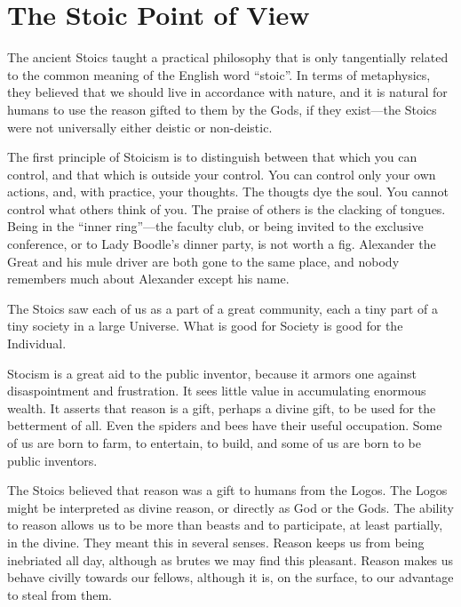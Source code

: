 \documentclass[
	fontsize=10pt, %
	twoside=false, %
	secnumdepth=1, %
]{kaobook}
\begin{document}
\chapter{The Stoic Point of View}

The ancient Stoics taught a practical philosophy that is only
tangentially related to the common meaning of the English word ``stoic''.
In terms of metaphysics, they believed that we should live in
accordance with nature, and it is natural for humans to use the reason
gifted to them by the Gods, if they exist---the Stoics were not
universally either deistic or non-deistic.

The first principle of Stoicism
is to distinguish between that which you can control, and that which
is outside your control.  You can control only your own actions, and,
with practice, your thoughts. The thougts dye the soul.  You cannot
control what others think of you.  The praise of others is the clacking
of tongues.  Being in the ``inner ring''---the faculty club, or being
invited to the exclusive conference, or to Lady Boodle's dinner party,
is not worth a fig.
Alexander the Great and his mule driver are both gone to the same place,
and nobody remembers much about Alexander except his name.

The Stoics saw each of us as a part of a great community, each a
tiny part of a tiny society in a large Universe.
What is good for Society is good for the Individual.

Stocism is a great aid to the public inventor,
because it armors one against disaspointment and frustration.
It sees little value in accumulating enormous wealth.
It asserts that reason is a gift, perhaps a divine gift,
to be used for the betterment of all.
Even the spiders and bees have their useful occupation.
Some of us are born to farm, to entertain, to build, and
some of us are born to be public inventors.

The Stoics believed that reason was a gift to humans from the Logos.
The Logos might be interpreted as divine reason, or directly
as God or the Gods.
The ability to reason allows us to be more than beasts
and to participate, at least partially, in the divine.
They meant this in several senses.
Reason keeps us from being inebriated
all day, although as brutes we may find this pleasant.
Reason makes us behave civilly towards our
fellows, although it is, on the surface, to our advantage
to steal from them.
\end{document}
